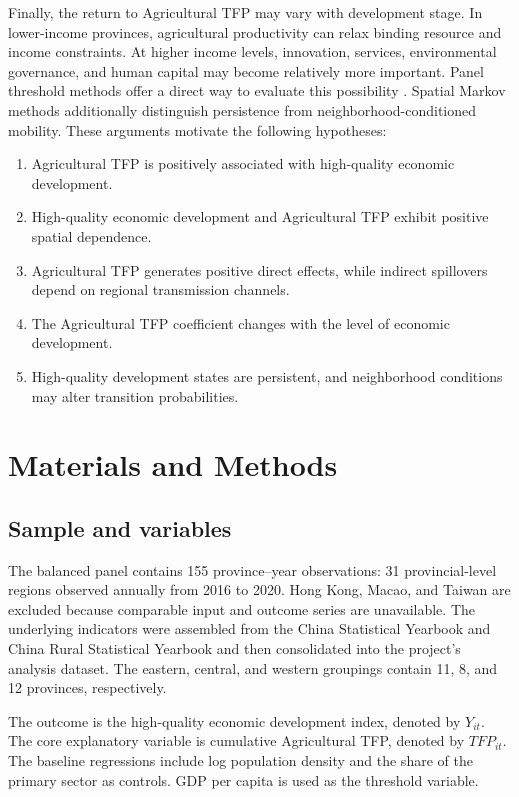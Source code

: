 \documentclass[sustainability,article,submit,moreauthors]{Definitions/mdpi}
\numberwithin{equation}{section}
\begin{document}
Finally, the return to Agricultural TFP may vary with development stage. In lower-income provinces, agricultural productivity can relax binding resource and income constraints. At higher income levels, innovation, services, environmental governance, and human capital may become relatively more important. Panel threshold methods offer a direct way to evaluate this possibility \cite{hansen1999}. Spatial Markov methods additionally distinguish persistence from neighborhood-conditioned mobility. These arguments motivate the following hypotheses:

\begin{enumerate}[label=H\arabic*.,leftmargin=2.4em]
\item Agricultural TFP is positively associated with high-quality economic development.
\item High-quality economic development and Agricultural TFP exhibit positive spatial dependence.
\item Agricultural TFP generates positive direct effects, while indirect spillovers depend on regional transmission channels.
\item The Agricultural TFP coefficient changes with the level of economic development.
\item High-quality development states are persistent, and neighborhood conditions may alter transition probabilities.
\end{enumerate}

\section{Materials and Methods}

\subsection{Sample and variables}

The balanced panel contains 155 province--year observations: 31 provincial-level regions observed annually from 2016 to 2020. Hong Kong, Macao, and Taiwan are excluded because comparable input and outcome series are unavailable. The underlying indicators were assembled from the China Statistical Yearbook and China Rural Statistical Yearbook and then consolidated into the project's analysis dataset. The eastern, central, and western groupings contain 11, 8, and 12 provinces, respectively.

The outcome is the high-quality economic development index, denoted by $Y_{it}$. The core explanatory variable is cumulative Agricultural TFP, denoted by $TFP_{it}$. The baseline regressions include log population density and the share of the primary sector as controls. GDP per capita is used as the threshold variable.
\end{document}

